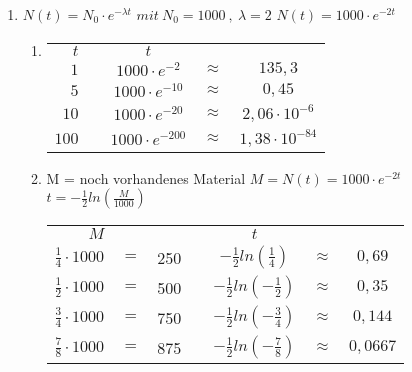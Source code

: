 \begin{enumerate}
	\item %
	$N(t)=N_0 \cdot e^{- \lambda t}$ \newline
  $mit \ N_0=1000 \ , \ \lambda=2$ \newline
  $N(t)=1000\cdot e^{-2t}$ \newline
	
	\begin{enumerate}
	\item 
	\begin{tabular}{rcccc}
	$t$ & & $ t$ & & \\
	$1$ & & $1000 \cdot e^{-2}$ & $\approx$ & $135,3$\\
	$5$ & & $1000 \cdot e^{-10}$ & $\approx$ & $0,45$\\
	$10$ & & $1000 \cdot e^{-20}$ & $\approx$ & $2,06 \cdot 10^{-6}$\\
	$100$ & & $1000 \cdot e^{-200}$ & $\approx$ & $1,38 \cdot 10^{-84}$\\
	\end{tabular}
	\item 
	M = noch vorhandenes Material \newline
	$M=N(t)=1000 \cdot e^{-2t}$ \newline
  $t =-\frac{1}{2} ln(\frac{M}{1000})$\newline
  
  \begin{tabular}{rcccccc}
	$M$ & & & & $ t$ & & \\
	$\frac{1}{4}\cdot 1000$ &$=$ &250& & $-\frac{1}{2}ln(\frac{1}{4})$ & $\approx$ & $0,69$\\
	$\frac{1}{2}\cdot 1000$ &$=$ &500& & $-\frac{1}{2}ln(-\frac{1}{2})$ & $\approx$ & $0,35$\\
	$\frac{3}{4}\cdot 1000$ &$=$ &750& & $-\frac{1}{2}ln(-\frac{3}{4})$ & $\approx$ & $0,144$\\
	$\frac{7}{8}\cdot 1000$ &$=$ &875& & $-\frac{1}{2}ln(-\frac{7}{8})$ & $\approx$ & $0,0667$\\
	\end{tabular}
	
	
	
	
		\end{enumerate}
	
		
   \end{enumerate}
  
